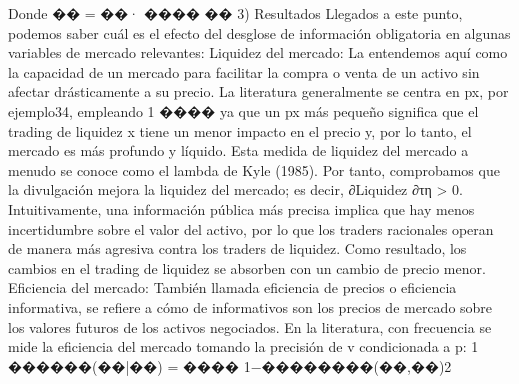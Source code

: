 \documentclass[10pt,a4paper]{article}
\begin{document}
Donde �� =
��· ����
��
3) Resultados
Llegados a este punto, podemos saber cuál es el efecto del desglose de información obligatoria en algunas variables de mercado relevantes: Liquidez del mercado: La entendemos aquí como la capacidad de un mercado para facilitar la compra o venta de un activo sin afectar drásticamente a su precio. La literatura generalmente se centra en px, por ejemplo34, empleando 1 ���� ya que un px más pequeño significa que el trading de liquidez x tiene un menor impacto en el precio y, por lo tanto, el mercado es más profundo y líquido. Esta medida de liquidez del mercado a menudo se conoce como el lambda de Kyle (1985). Por tanto, comprobamos que la divulgación mejora la liquidez del mercado; es decir, ∂Liquidez ∂τη > 0. Intuitivamente, una información pública más precisa implica que hay menos incertidumbre sobre el valor del activo, por lo que los traders racionales operan de manera más agresiva contra los traders de liquidez. Como resultado, los cambios en el trading de liquidez se absorben con un cambio de precio menor. Eficiencia del mercado: También llamada eficiencia de precios o eficiencia informativa, se refiere a cómo de informativos son los precios de mercado sobre los valores futuros de los activos negociados. En la literatura, con frecuencia se mide la eficiencia del mercado tomando la precisión de v condicionada a p:
1
������(��|��)
=
����
1−��������(��,��)2 
\end{document}
